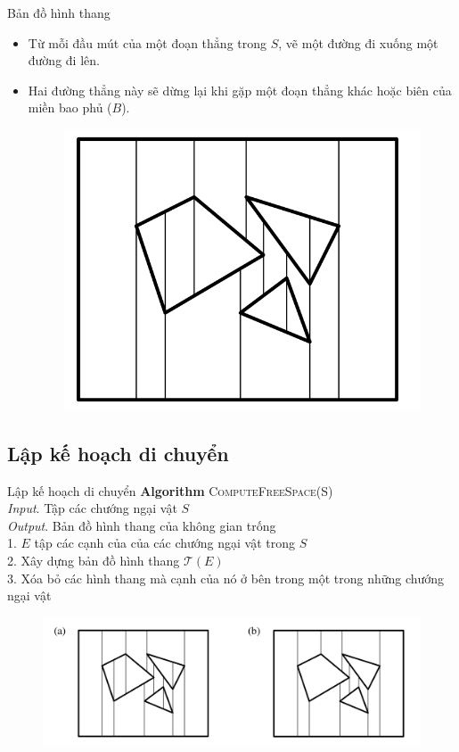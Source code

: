 \documentclass[compress]{beamer}
\begin{document}
\begin{frame}{Bản đồ hình thang}
\begin{itemize}
\item Từ mỗi đầu mút của một đoạn thẳng trong $S$, vẽ một đường đi xuống một đường đi lên. 
\item Hai đường thẳng này sẽ dừng lại khi gặp một đoạn thẳng khác hoặc biên của miền bao phủ ($B$).
\begin{figure}[H]
\centering
\includegraphics[scale=0.2]{trmap.png}
\end{figure}
\end{itemize}
\end{frame}

\subsection{Lập kế hoạch di chuyển}
\begin{frame}{Lập kế hoạch di chuyển}
\textbf{Algorithm} \textsc{ComputeFreeSpace(S)}\\
\emph{Input}. Tập các chướng ngại vật $S$\\
\emph{Output}. Bản đồ hình thang của không gian trống\\
1. $E$ tập các cạnh của của các chướng ngại vật trong $S$\\
2. Xây dựng bản đồ hình thang $\mathcal{T}(E)$\\
3. Xóa bỏ các hình thang mà cạnh của nó ở bên trong một trong những chướng ngại vật
\begin{figure}[H]
\centering
\includegraphics[scale=0.25]{trapezoidal_free_space.png}
\end{figure}
\end{frame}
\end{document}
